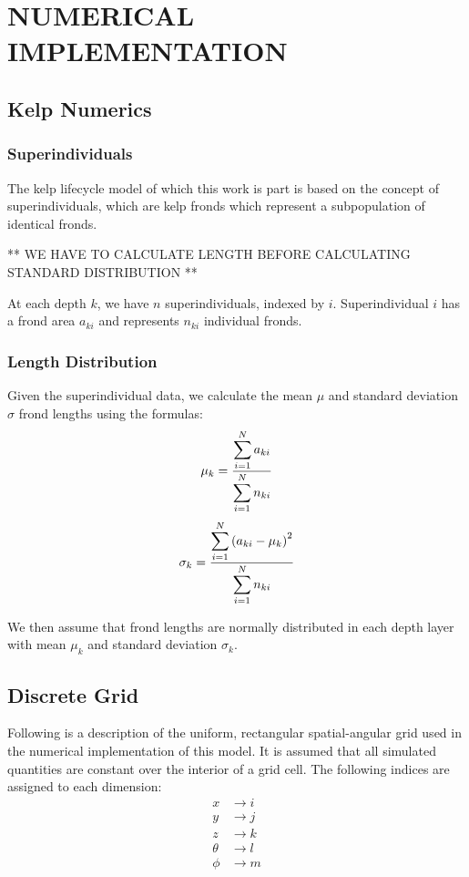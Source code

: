 \chapter{NUMERICAL IMPLEMENTATION}

\section{Kelp Numerics}
\subsection{Superindividuals}

The kelp lifecycle model of which this work is part is based on the concept of
superindividuals, which are kelp fronds which represent a subpopulation of
identical fronds.

** WE HAVE TO CALCULATE LENGTH BEFORE CALCULATING STANDARD DISTRIBUTION **

At each depth $k$, we have $n$ superindividuals, indexed by $i$. Superindividual
$i$ has a frond area $a_{ki}$ and represents $n_{ki}$ individual fronds.

\subsection{Length Distribution}

Given the superindividual data, we calculate the mean $\mu$ and standard deviation $\sigma$ frond
lengths using the formulas:
\begin{equation}
  \mu_k = \frac{\displaystyle \sum_{i=1}^N a_{ki}}{\displaystyle \sum_{i=1}^N n_{ki}} 
\end{equation}
\begin{equation}
  \sigma_k = \frac{\displaystyle \sum_{i=1}^N \left( a_{ki} - \mu_k \right)^2}{\displaystyle \sum_{i=1}^N n_{ki}} 
\end{equation}

We then assume that frond lengths are normally distributed in each depth layer
with mean $\mu_k$ and standard deviation $\sigma_k$.

\section{Discrete Grid}
Following is a description of the uniform, rectangular spatial-angular grid used
in the numerical implementation of this model.
It is assumed that all simulated quantities are constant over the interior of a
grid cell.
The following indices are assigned to each dimension:
\begin{align}
  x &\to i \\
  y &\to j \\
  z &\to k \\
  \theta &\to l \\
  \phi &\to m
\end{align}

